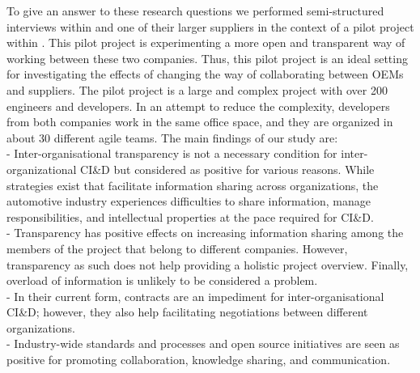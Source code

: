 To give an answer to these research questions we performed semi-structured interviews within \company{} 
and 
one of their larger suppliers in the context of a pilot project within \company{}. %
This pilot project is experimenting a more open and transparent way of working between these two companies. Thus, this pilot project is an ideal setting for investigating the effects of changing the way of collaborating between OEMs and suppliers.  
The pilot project is a large and complex project with over 200 engineers and developers. 
In an attempt to reduce the complexity, developers from both companies work in the same office space, and they are organized in about 30 different agile teams. %
The main findings of our study are:\\
{} - Inter-organisational transparency is not a necessary condition for inter-organizational CI\&D but considered as positive for various reasons. %
While strategies exist that facilitate information sharing  across organizations, the automotive industry experiences difficulties to share information, manage responsibilities, and intellectual properties at the pace required for CI\&D.\\ %
{} - Transparency has positive effects on increasing information sharing among the members of the project that belong to different companies. However, transparency as such does not help providing a holistic project overview. Finally, overload of information is unlikely to be considered a problem.\\
{} - In their current form, contracts are an impediment for inter-or\-ga\-nisational CI\&D; however, they also help facilitating negotiations between different organizations. \\
{} - Industry-wide standards and processes and open source initiatives are seen as positive for promoting collaboration, knowledge sharing, and communication.

